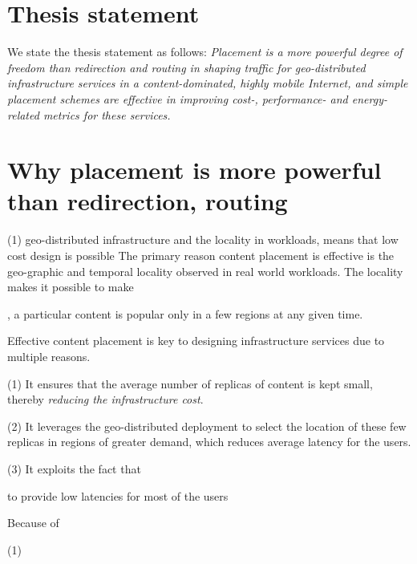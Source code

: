 

\section{Thesis statement}

We state the thesis statement as follows: \emph{Placement is a more powerful degree of freedom than redirection and routing in shaping traffic for geo-distributed infrastructure services in a content-dominated, highly mobile Internet, and simple placement schemes are effective in improving cost-, performance- and energy-related metrics for these services.}


\section{Why placement is more powerful than redirection, routing}


(1) geo-distributed infrastructure and the locality in workloads,
means that low cost design is possible 
The primary reason content placement is effective is the geo-graphic and temporal locality observed in real world workloads. The locality makes it possible to make 

, a particular content is popular only in a few regions at any given time. 

Effective content placement is key to designing infrastructure services due to multiple reasons. 

(1) It ensures that the average number of replicas of content is kept small, thereby \emph{reducing the infrastructure cost}.

(2) It leverages the geo-distributed deployment to select the location of these few replicas in regions of greater demand, which reduces average latency for the users.

(3) It exploits the fact that 

 to provide low latencies for most of the users

Because of 

(1) 

